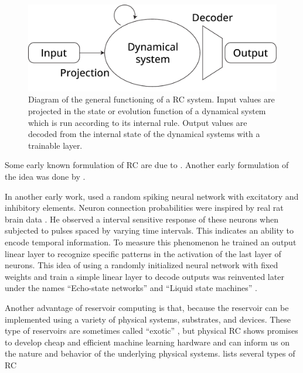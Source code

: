 \begin{figure}[htbp]
  \centering
  \includegraphics[width=.8\linewidth]{figures/reservoir_schema}
  \caption{Diagram of the general functioning of a \ac{RC} system. Input values
    are projected in the state or evolution function of a dynamical system which
    is run according to its internal rule. Output values are decoded from the
    internal state of the dynamical systems with a trainable layer.}
  \label{fig:reservoir_diagram}
\end{figure}

Some early known formulation of \ac{RC} are due to
\textcite{kirbyContextDynamicsNeural1991}. Another early formulation of the idea
was done by \textcite{schomakerNeuralNetworkModels1990,
  schomakerSimulationRecognitionHandwriting1991,
  schomakerNeuralOscillatornetworkModel1992}.

In another early work, \textcite{buonomanoTemporalInformationTransformed1995}
used a random spiking neural network with excitatory and inhibitory elements.
Neuron connection probabilities were inspired by real rat brain data
\parencite{masonSynapticTransmissionIndividual1991}. He observed a interval
sensitive response of these neurons when subjected to pulses spaced by varying
time intervals. This indicates an ability to encode temporal information. To
measure this phenomenon he trained an output linear layer to recognize specific
patterns in the activation of the last layer of neurons. This idea of using a
randomly initialized neural network with fixed weights and train a simple linear
layer to decode outputs was reinvented later under the names ``Echo-state
networks'' \parencite{jaegerEchoStateApproach2001} and ``Liquid state machines''
\parencite{maassRealTimeComputingStable2002}.

Another advantage of reservoir computing is that, because the reservoir can be
implemented using a variety of physical systems, substrates, and devices. These
type of reservoirs are sometimes called ``exotic''
\parencite{lukoseviciusReservoirComputingApproaches2009}, but physical \ac{RC}
shows promises to develop cheap and efficient machine learning hardware and can
inform us on the nature and behavior of the underlying physical systems.
\textcite{tanakaRecentAdvancesPhysical2019} lists several types of \ac{RC}

